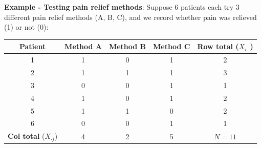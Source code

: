 \textbf{Example - Testing pain relief methods}: Suppose 6 patients each try 3 different pain relief
methods (A, B, C), and we record whether pain was relieved (1) or not (0):

\begin{center}
\begin{tabular}{|c|c|c|c||c|}
    \hline
    \textbf{Patient} & \textbf{Method A} & \textbf{Method B} & \textbf{Method C} & \textbf{Row total} ($X_{i\cdot}$)\\
    \hline
    1 & 1 & 0 & 1 & 2\\
    \hline
    2 & 1 & 1 & 1 & 3\\
    \hline
    3 & 0 & 0 & 1 & 1\\
    \hline
    4 & 1 & 0 & 1 & 2\\
    \hline
    5 & 1 & 1 & 0 & 2\\
    \hline
    6 & 0 & 0 & 1 & 1\\
    \hline
    \hline
    \textbf{Col total} ($X_{\cdot j}$) & 4 & 2 & 5 & $N = 11$\\
    \hline
\end{tabular}
\end{center}


